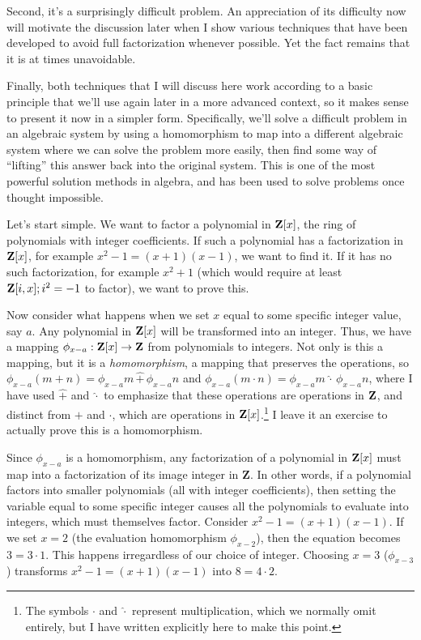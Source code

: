 Second, it's a surprisingly difficult problem.  An appreciation of its
difficulty now will motivate the discussion later when I show various
techniques that have been developed to avoid full factorization
whenever possible.  Yet the fact remains that it is at times
unavoidable.

Finally, both techniques that I will discuss here work according to a
basic principle that we'll use again later in a more advanced context,
so it makes sense to present it now in a simpler form.  Specifically,
we'll solve a difficult problem in an algebraic system by using a
homomorphism to map into a different algebraic system where we can
solve the problem more easily, then find some way of ``lifting'' this
answer back into the original system.  This is one of the most
powerful solution methods in algebra, and has been used to solve
problems once thought impossible.

Let's start simple.  We want to factor a polynomial in ${\bf Z}[x]$,
the ring of polynomials with integer coefficients.  If such a
polynomial has a factorization in ${\bf Z}[x]$, for example
$x^2-1=(x+1)(x-1)$, we want to find it.  If it has no such
factorization, for example $x^2+1$ (which would require at least ${\bf
Z}[i,x]; i^2=-1$ to factor), we want to prove this.

Now consider what happens when we set $x$ equal to some specific
integer value, say $a$.  Any polynomial in ${\bf Z}[x]$ will be
transformed into an integer.  Thus, we have a mapping $\phi_{x-a}:
{\bf Z}[x] \rightarrow {\bf Z}$ from polynomials to integers.  Not
only is this a mapping, but it is a {\it homomorphism}, a mapping that
preserves the operations, so $\phi_{x-a} (m+n) = \phi_{x-a}m \,\hat+\,
\phi_{x-a}n$ and $\phi_{x-a} (m\cdot n) = \phi_{x-a}m \,\hat\cdot\,
\phi_{x-a}n$, where I have used $\hat+$ and $\hat\cdot$ to emphasize
that these operations are operations in ${\bf Z}$, and distinct from
$+$ and $\cdot$, which are operations in ${\bf Z}[x]$.\footnote{The
symbols $\cdot$ and $\hat\cdot$ represent multiplication, which we normally
omit entirely, but I have written explicitly here to make this point.}
I leave it an exercise to actually prove this is a homomorphism.

Since $\phi_{x-a}$ is a homomorphism, any factorization of a
polynomial in ${\bf Z}[x]$ must map into a factorization of its image
integer in {\bf Z}.  In other words, if a polynomial factors into
smaller polynomials (all with integer coefficients), then setting the
variable equal to some specific integer causes all the polynomials to
evaluate into integers, which must themselves factor.  Consider
$x^2-1=(x+1)(x-1)$.  If we set $x=2$ (the evaluation homomorphism
$\phi_{x-2}$), then the equation becomes $3=3\cdot1$.  This happens
irregardless of our choice of integer.  Choosing $x=3$ ($\phi_{x-3}$)
transforms $x^2-1=(x+1)(x-1)$ into $8=4\cdot2$.

